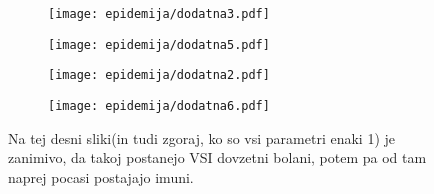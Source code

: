 \documentclass{article}
\begin{document}
\begin{figure}[H]
\centering
\begin{subfigure}{.49\textwidth}
\texttt{[image: epidemija/dodatna3.pdf]}
\end{subfigure}
\begin{subfigure}{.49\textwidth}
\texttt{[image: epidemija/dodatna5.pdf]}
\end{subfigure}
\end{figure}

\begin{figure}[H]
\centering
\begin{subfigure}{.49\textwidth}
\texttt{[image: epidemija/dodatna2.pdf]}
\end{subfigure}
\begin{subfigure}{.49\textwidth}
\texttt{[image: epidemija/dodatna6.pdf]}
\end{subfigure}
\caption*{Na tej desni sliki(in tudi zgoraj, ko so vsi parametri enaki 1) je zanimivo, da takoj postanejo VSI dovzetni bolani, potem pa od tam naprej pocasi postajajo imuni.}
\end{figure}
\end{document}
